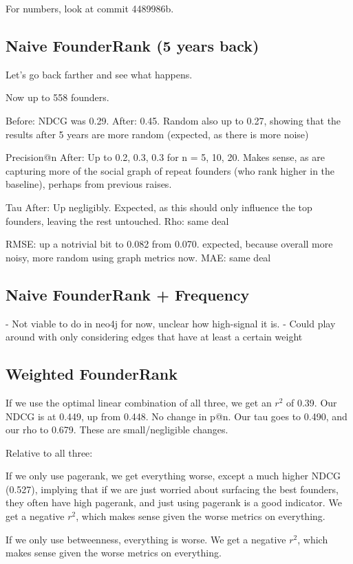 For numbers, look at commit 4489986b.

\subsection{Naive FounderRank (5 years back)}

Let's go back farther and see what happens.

Now up to 558 founders.

Before: NDCG was 0.29.
After: 0.45. Random also up to 0.27, showing that the results after 5 years are more random (expected, as there is more noise)

Precision@n After: Up to 0.2, 0.3, 0.3 for n = 5, 10, 20. Makes sense, as are capturing more of the social graph of repeat founders (who rank higher in the baseline), perhaps from previous raises.

Tau After: Up negligibly. Expected, as this should only influence the top founders, leaving the rest untouched.
Rho: same deal

RMSE: up a notrivial bit to 0.082 from 0.070. expected, because overall more noisy, more random using graph metrics now.
MAE: same deal

\subsection{Naive FounderRank + Frequency}

- Not viable to do in neo4j for now, unclear how high-signal it is.
- Could play around with only considering edges that have at least a certain weight

\subsection{Weighted FounderRank}

If we use the optimal linear combination of all three, we get an $r^2$ of 0.39. Our NDCG is at 0.449, up from 0.448. No change in p@n. Our tau goes to 0.490, and our rho to 0.679. These are small/negligible changes.

Relative to all three:

If we only use pagerank, we get everything worse, except a much higher NDCG (0.527), implying that if we are just worried about surfacing the best founders, they often have high pagerank, and just using pagerank is a good indicator. We get a negative $r^2$, which makes sense given the worse metrics on everything.

If we only use betweenness, everything is worse. We get a negative $r^2$, which makes sense given the worse metrics on everything.

